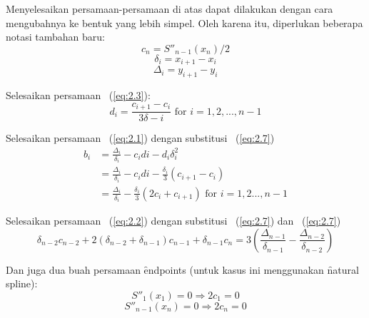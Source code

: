 Menyelesaikan persamaan-persamaan di atas dapat dilakukan dengan cara mengubahnya ke bentuk yang lebih simpel. Oleh karena itu, diperlukan beberapa notasi tambahan baru:
\begin{equation} \label{eq:2.4}  c_n = S''_{n-1}(x_n) / 2  \end{equation}
\begin{equation} \label{eq:2.5} \delta_{i} = x_{i+1} - x_i \end{equation}
\begin{equation} \label{eq:2.6} \Delta_{i} = y_{i+1} - y_i \end{equation}

Selesaikan persamaan \equ~(\ref{eq:2.3}):
\begin{equation} \label{eq:2.7}
	d_i = \frac{ c_{i+1} - c_i }{ 3\delta-{i} } \text{   for } i=1,2,...,n-1
\end{equation}

Selesaikan persamaan \equ~(\ref{eq:2.1}) dengan substitusi \equ~(\ref{eq:2.7})
\begin{equation} \label{eq:2.8}
	\begin{split}
		b_i &=  \frac{\Delta_i}{\delta_i} - c_{i}d{i} - d_{i}\delta^2_{i} \\
		&= \frac{\Delta_i}{\delta_i} - c_{i}d{i} - \frac{\delta_i}{3}(c_{i+1} - c_i) \\
		&= \frac{\Delta_i}{\delta_i} - \frac{\delta_i}{3}(2c_i + c_{i+1}) \text{   for } i = 1,2...,n-1
	\end{split}
\end{equation}

Selesaikan persamaan \equ~(\ref{eq:2.2}) dengan substitusi \equ~(\ref{eq:2.7}) dan \equ~(\ref{eq:2.7})
\begin{equation} \label{eq:2.9}
	\delta_{n-2}c_{n-2} + 2(\delta_{n-2} + \delta_{n-1})c_{n-1} + \delta_{n-1}c_n = 3(\frac{\Delta_{n-1}}{\delta_{n-1}} - \frac{\Delta_{n-2}}{\delta_{n-2}})
\end{equation}

Dan juga dua buah persamaan \f{endpoints} (untuk kasus ini menggunakan \f{natural spline}):
$$ S''_{1}(x_1) = 0 \Rightarrow 2c_1 = 0 $$
$$ S''_{n-1}(x_n) = 0 \Rightarrow 2c_n = 0 $$

